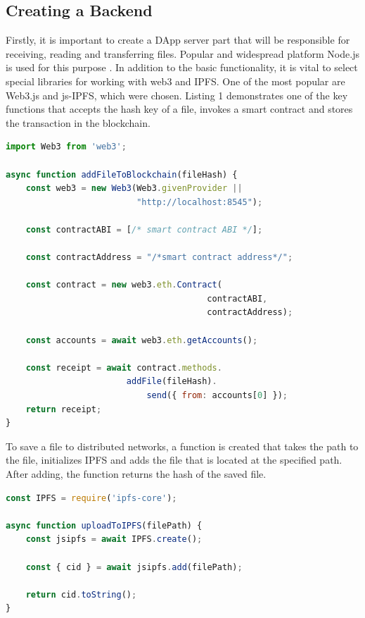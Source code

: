 \documentclass[10pt,conference,a4paper]{IEEEtran_EDM}
\begin{document}
\subsection{Creating a Backend}
Firstly, it is important to create a DApp server part that will be responsible for receiving, reading and transferring files.
Popular and widespread platform Node.js is used for this purpose \cite{Herron}.
In addition to the basic functionality, it is vital to select special libraries for working with web3 and IPFS.
One of the most popular are Web3.js and js-IPFS, which were chosen.
Listing 1 demonstrates one of the key functions that accepts the hash key of a file, invokes a smart contract and stores the transaction in the blockchain.


\begin{lstlisting}[language=JavaScript, caption=JavaScript code implementing saving to the blockchain]
import Web3 from 'web3';

async function addFileToBlockchain(fileHash) {
    const web3 = new Web3(Web3.givenProvider ||
                          "http://localhost:8545");

    const contractABI = [/* smart contract ABI */];

    const contractAddress = "/*smart contract address*/";

    const contract = new web3.eth.Contract(
                                        contractABI,
                                        contractAddress);

    const accounts = await web3.eth.getAccounts();

    const receipt = await contract.methods.
                        addFile(fileHash).
                            send({ from: accounts[0] });
    return receipt;
}
\end{lstlisting}

To save a file to distributed networks, a function is created that takes the path to the file, initializes IPFS and adds the file that is located at the specified path.
After adding, the function returns the hash of the saved file.

\begin{lstlisting}[language=JavaScript, caption= Saving a file to IPFS]
const IPFS = require('ipfs-core');

async function uploadToIPFS(filePath) {
    const jsipfs = await IPFS.create();

    const { cid } = await jsipfs.add(filePath);

    return cid.toString();
}
\end{lstlisting}
\end{document}
